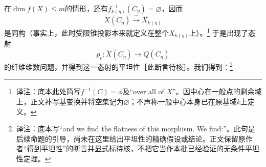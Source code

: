 \documentclass[openany,fontset=fandol]{ctexbook}
\newcommand{\note}[1]{\footnote{译注：#1}}
\begin{document}
\newpage
在$\dim f(X)\leq m$的情形，还有$f_{k(\eta)}^{-1}(C_\eta)=\varnothing$，因而
\[
\widetilde X(C_\eta)\xrightarrow{\ \sim\ }X_{k(\eta)}
\]
是同构（事实上，此时受限锥投影本来就定义在整个$X_{k(\eta)}$上）。\note{底本此处简写$f^{-1}(C)=\phi$及“over all of $X$”。因中心在一般点的剩余域上，正文补写基变换并将空集记为$\varnothing$；不声称一般中心本身已在原基域$k$上定义。}
于是出现了态射
\[
p_c:\widetilde X(C_\eta)\longrightarrow Q(C_\eta)
\]
的纤维维数问题，并得到这一态射的平坦性［此断言待核］。我们得到：\note{底本写“and we find the flatness of this morphism. We find:”。此句是后续命题的引导，尚未在这里给出平坦性的精确假设或结论。正文保留原作者“得到平坦性”的断言并显式标待核，不把它当作本批已经验证的无条件平坦性定理。}
\end{document}
